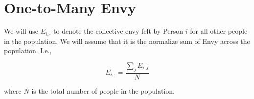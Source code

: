 \section{One-to-Many Envy}

We will use $E_{i,\cdot}$ to denote the collective envy felt by Person $i$ for all other people in the population. We will assume that it is the normalize sum of Envy across the population. I.e.,

\begin{equation}
    E_{i,\cdot} = \frac{\sum_{j} E_{i,j}}{N}
\end{equation}

where $N$ is the total number of people in the population.


